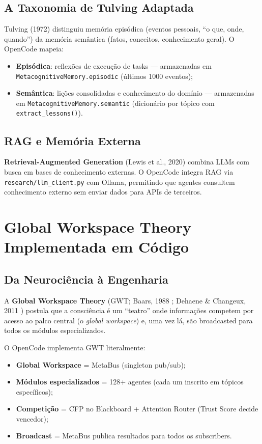 \subsection{A Taxonomia de Tulving Adaptada}

Tulving (1972) \cite{tulving1972episodic} distinguiu memória episódica (eventos pessoais, ``o que, onde, quando'') da memória semântica (fatos, conceitos, conhecimento geral). O OpenCode mapeia:

\begin{itemize}
    \item \textbf{Episódica}: reflexões de execução de tasks — armazenadas em \texttt{MetacognitiveMemory.episodic} (últimos 1000 eventos);
    \item \textbf{Semântica}: lições consolidadas e conhecimento do domínio — armazenadas em \texttt{MetacognitiveMemory.semantic} (dicionário por tópico com \texttt{extract\_lessons()}).
\end{itemize}

\subsection{RAG e Memória Externa}

\textbf{Retrieval-Augmented Generation} (Lewis et al., 2020) \cite{lewis2020retrieval} combina LLMs com busca em bases de conhecimento externas. O OpenCode integra RAG via \texttt{research/llm\_client.py} com Ollama, permitindo que agentes consultem conhecimento externo sem enviar dados para APIs de terceiros.

\section{Global Workspace Theory Implementada em Código}

\subsection{Da Neurociência à Engenharia}

A \textbf{Global Workspace Theory} (GWT; Baars, 1988 \cite{baars1988cognitive}; Dehaene \& Changeux, 2011 \cite{dehaene2011experimental}) postula que a consciência é um ``teatro'' onde informações competem por acesso ao palco central (o \textit{global workspace}) e, uma vez lá, são broadcasted para todos os módulos especializados.

O OpenCode implementa GWT literalmente:

\begin{itemize}
    \item \textbf{Global Workspace} = MetaBus (singleton pub/sub);
    \item \textbf{Módulos especializados} = 128+ agentes (cada um inscrito em tópicos específicos);
    \item \textbf{Competição} = CFP no Blackboard + Attention Router (Trust Score decide vencedor);
    \item \textbf{Broadcast} = MetaBus publica resultados para todos os subscribers.
\end{itemize}

